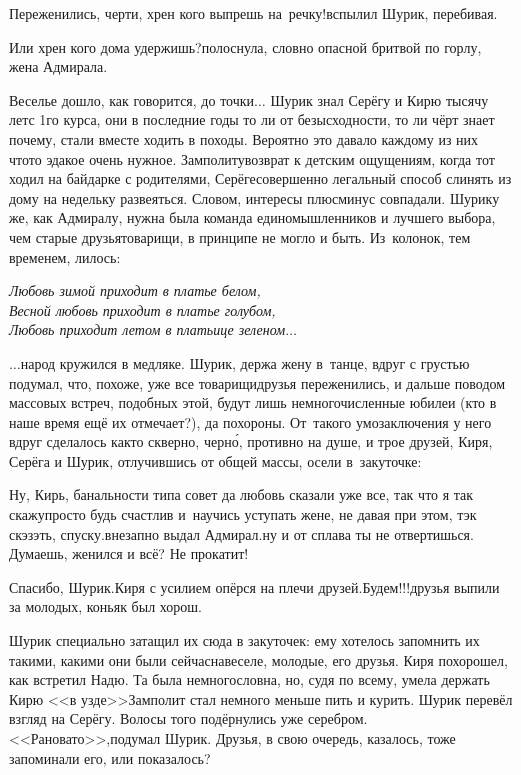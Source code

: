 {\diagdash Переженились, черти, хрен кого выпрешь на~речку!\mdash вспылил Шурик, перебивая.

\diagdash Или хрен кого дома удержишь?\mdash полоснула, словно опасной бритвой по горлу, жена Адмирала. 

Веселье дошло, как говорится, до точки$\ldots$ Шурик знал Серёгу и Кирю тысячу лет\mdash с 1\sdash го курса, они в последние годы то ли от безысходности, то ли чёрт знает почему, стали вместе ходить в походы. Вероятно это давало каждому из них что\sdash то эдакое очень нужное. Замполиту\mdash возврат к детским ощущениям, когда тот ходил на байдарке с родителями, Серёге\mdash совершенно легальный способ слинять из дому на недельку развеяться. Словом, интересы плюс\sdash минус совпадали. Шурику же, как Адмиралу, нужна была команда единомышленников и лучшего выбора, чем старые друзья\sdash товарищи, в принципе не могло и быть. Из~колонок, тем временем, лилось:

\vspace{0.1cm}
\noindent\textit{%
	\hspace*{1.4cm}Любовь зимой приходит в платье белом,\\
	\hspace*{1.4cm}Весной любовь приходит в платье голубом,\\
	\hspace*{1.4cm}Любовь приходит летом в платьице зеленом$\ldots$
}

$\ldots$народ кружился в медляке. Шурик, держа жену в~танце, вдруг с грустью подумал, что, похоже, уже все товарищи\sdash друзья переженились, и дальше поводом массовых встреч, подобных этой, будут лишь немногочисленные юбилеи (кто в наше время ещё их отмечает?), да похороны. От~такого умозаключения у него вдруг сделалось как\sdash то скверно, черн\'{о}, противно на душе, и трое друзей, Киря, Серёга и Шурик, отлучившись от общей массы, осели в~закуточке:

\diagdash Ну, Кирь, банальности типа совет да любовь сказали уже все, так что я так скажу\mdash просто будь счастлив и~научись уступать жене, не давая при этом, тэк скэзэть, спуску.\mdash внезапно выдал Адмирал.\mdash ну и от сплава ты не отвертишься. Думаешь, женился и всё? Не прокатит!

\diagdash Спасибо, Шурик.\mdash Киря с усилием опёрся на плечи друзей.\mdash Будем!!!\mdash друзья выпили за молодых, коньяк был хорош.

Шурик специально затащил их сюда в закуточек: ему хотелось запомнить их такими, какими они были сейчас\mdash навеселе, молодые, его друзья. Киря похорошел, как встретил Надю. Та была немногословна, но, судя по всему, умела держать Кирю <<в узде>>\mdash Замполит стал немного меньше пить и курить. Шурик перевёл взгляд на Серёгу. Волосы того подёрнулись уже серебром. <<Рановато>>,\mdash подумал Шурик. Друзья, в свою очередь, казалось, тоже запоминали его, или показалось?

}
